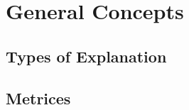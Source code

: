 \section{General Concepts}
\blindtext[3]
\subsection{Types of Explanation}
\blindtext[3]
\subsection{Metrices}
\blindtext[3]